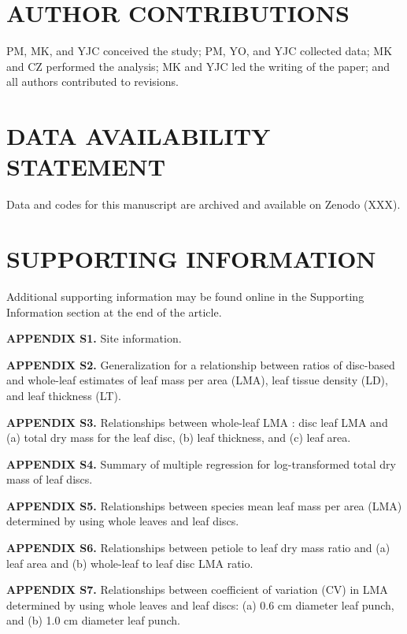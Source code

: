 \documentclass[
  12pt,
  a4paper,
,tablecaptionabove
]{scrartcl}
\begin{document}
\hypertarget{author-contributions}{%
\section{AUTHOR CONTRIBUTIONS}\label{author-contributions}}

PM, MK, and YJC conceived the study; PM, YO, and YJC collected data; MK
and CZ performed the analysis; MK and YJC led the writing of the paper;
and all authors contributed to revisions.

\hypertarget{data-availability-statement}{%
\section{DATA AVAILABILITY
STATEMENT}\label{data-availability-statement}}

Data and codes for this manuscript are archived and available on Zenodo
(XXX).

\hypertarget{supporting-information}{%
\section{SUPPORTING INFORMATION}\label{supporting-information}}

Additional supporting information may be found online in the Supporting
Information section at the end of the article.

\textbf{APPENDIX S1.} Site information.

\textbf{APPENDIX S2.} Generalization for a relationship between ratios
of disc-based and whole-leaf estimates of leaf mass per area (LMA), leaf
tissue density (LD), and leaf thickness (LT).

\textbf{APPENDIX S3.} Relationships between whole-leaf LMA : disc leaf
LMA and (a) total dry mass for the leaf disc, (b) leaf thickness, and
(c) leaf area.

\textbf{APPENDIX S4.} Summary of multiple regression for log-transformed
total dry mass of leaf discs.

\textbf{APPENDIX S5.} Relationships between species mean leaf mass per
area (LMA) determined by using whole leaves and leaf discs.

\textbf{APPENDIX S6.} Relationships between petiole to leaf dry mass
ratio and (a) leaf area and (b) whole-leaf to leaf disc LMA ratio.

\textbf{APPENDIX S7.} Relationships between coefficient of variation
(CV) in LMA determined by using whole leaves and leaf discs: (a) 0.6 cm
diameter leaf punch, and (b) 1.0 cm diameter leaf punch.
\end{document}
